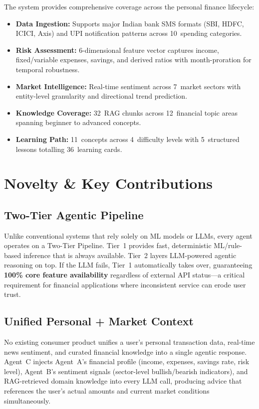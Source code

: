 \documentclass[conference]{IEEEtran}
\begin{document}
The system provides comprehensive coverage across the personal finance lifecycle:
\begin{itemize}[leftmargin=*]
  \item \textbf{Data Ingestion:} Supports major Indian bank SMS formats (SBI, HDFC, ICICI, Axis) and UPI notification patterns across 10~spending categories.
  \item \textbf{Risk Assessment:} 6-dimensional feature vector captures income, fixed/variable expenses, savings, and derived ratios with month-proration for temporal robustness.
  \item \textbf{Market Intelligence:} Real-time sentiment across 7~market sectors with entity-level granularity and directional trend prediction.
  \item \textbf{Knowledge Coverage:} 32~RAG chunks across 12~financial topic areas spanning beginner to advanced concepts.
  \item \textbf{Learning Path:} 11~concepts across 4~difficulty levels with 5~structured lessons totalling 36~learning cards.
\end{itemize}

\section{Novelty \& Key Contributions}

\subsection{Two-Tier Agentic Pipeline}
Unlike conventional systems that rely solely on ML models or LLMs, every agent operates on a Two-Tier Pipeline. Tier~1 provides fast, deterministic ML/rule-based inference that is always available. Tier~2 layers LLM-powered agentic reasoning on top. If the LLM fails, Tier~1 automatically takes over, guaranteeing \textbf{100\% core feature availability} regardless of external API status---a critical requirement for financial applications where inconsistent service can erode user trust.

\subsection{Unified Personal + Market Context}
No existing consumer product unifies a user's personal transaction data, real-time news sentiment, and curated financial knowledge into a single agentic response. Agent~C injects Agent~A's financial profile (income, expenses, savings rate, risk level), Agent~B's sentiment signals (sector-level bullish/bearish indicators), and RAG-retrieved domain knowledge into every LLM call, producing advice that references the user's actual amounts and current market conditions simultaneously.
\end{document}
